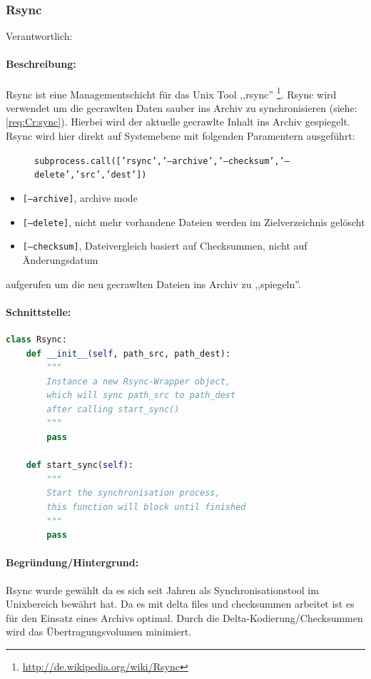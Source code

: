 
\subsubsection{Rsync}
\label{ssub:rsync}
Verantwortlich: \ci 
\paragraph{Beschreibung:}
\label{par:beschreibung_}
Rsync ist eine Managementschicht für das Unix Tool ,,rsync'' \footnote{\url{http://de.wikipedia.org/wiki/Rsync}}. Rsync wird verwendet um die gecrawlten Daten sauber ins Archiv zu synchronisieren (siehe: \ref{req:Cr:sync}).
Hierbei wird der aktuelle gecrawlte Inhalt ins Archiv gespiegelt.
\\
Rsync wird hier direkt auf Systemebene mit folgenden Paramentern ausgeführt:
\begin{figure}[H]
    \centering    
    \texttt{subprocess.call(['rsync','--archive','--checksum','--delete','src','dest'])}
\end{figure}

\begin{itemize}
    \item \texttt{[--archive]}, archive mode
    \item \texttt{[--delete]}, nicht mehr vorhandene Dateien werden im Zielverzeichnis gelöscht
    \item \texttt{[--checksum]}, Dateivergleich basiert auf Checksummen, nicht auf Änderungsdatum
\end{itemize}
aufgerufen um die neu gecrawlten Dateien ins Archiv zu ,,spiegeln''.

\paragraph{Schnittstelle:}
\label{par:schnittstelle_}
\hfill
\begin{lstlisting}[language=python]
class Rsync:
    def __init__(self, path_src, path_dest):
        """
        Instance a new Rsync-Wrapper object,
        which will sync path_src to path_dest
        after calling start_sync() 
        """
        pass

    def start_sync(self):
        """
        Start the synchronisation process,
        this function will block until finished
        """
        pass
\end{lstlisting}

\paragraph{Begründung/Hintergrund:}
\label{par:begr_ndung_hintergrund_}
Rsync wurde gewählt da es sich seit Jahren als Synchronisationstool im Unixbereich bewährt hat.
Da es mit delta files und checksummen arbeitet ist es für den Einsatz eines Archivs optimal.
Durch die Delta-Kodierung/Checksummen wird das Übertragungsvolumen minimiert.

